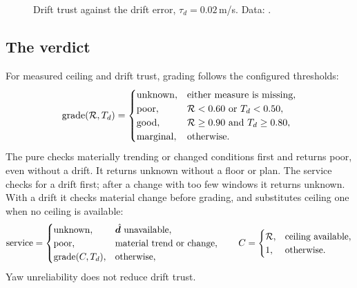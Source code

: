 \begin{figure}[ht]
\centering
{}
\caption{Drift trust against the drift error, $\tau_d = 0.02$\,m/s. Data:
.}
\label{fig:ready-dtrust}
\end{figure}

\subsection{The verdict}

For measured ceiling and drift trust, grading follows the configured thresholds:
\[
 \mathrm{grade}(\mathcal R,T_d)=
 \begin{cases}
 \mathrm{unknown},&\text{either measure is missing},\\
 \mathrm{poor},&\mathcal R<0.60\text{ or }T_d<0.50,\\
 \mathrm{good},&\mathcal R\ge0.90\text{ and }T_d\ge0.80,\\
 \mathrm{marginal},&\text{otherwise}.
 \end{cases}
\]
The pure  checks materially trending or changed conditions first and
returns poor, even without a drift. It returns unknown without a floor or plan.
The service checks for a drift first; after a change with too few windows it
returns unknown. With a drift it checks material change before grading, and
substitutes ceiling one when no ceiling is available:
\[
 \mathrm{service}=\begin{cases}
 \mathrm{unknown},&\hat{\bm d}\text{ unavailable},\\
 \mathrm{poor},&\text{material trend or change},\\
 \mathrm{grade}(C,T_d),&\text{otherwise},
 \end{cases}
 \qquad C=\begin{cases}\mathcal R,&\text{ceiling available},\\1,&\text{otherwise}.\end{cases}
\]
Yaw unreliability does not reduce drift trust.

